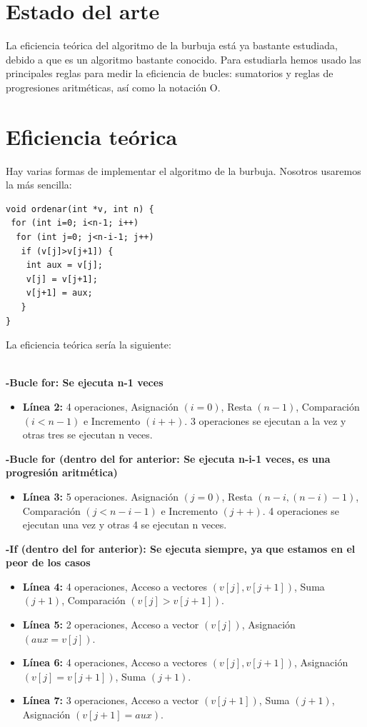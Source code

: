 \documentclass[a4paper,11pt]{article}
\begin{document}
\section{Estado del arte}
La eficiencia teórica del algoritmo de la burbuja está ya bastante estudiada, debido a que es un algoritmo bastante conocido. Para estudiarla hemos usado las principales reglas para medir la eficiencia de bucles: sumatorios y reglas de progresiones aritméticas, así como la notación O.
\section{Eficiencia teórica}
Hay varias formas de implementar el algoritmo de la burbuja. Nosotros usaremos la más sencilla:
\lstset{language=C, breaklines=true, basicstyle=\footnotesize}
\begin{lstlisting}[frame=single]
void ordenar(int *v, int n) {
 for (int i=0; i<n-1; i++)
  for (int j=0; j<n-i-1; j++)
   if (v[j]>v[j+1]) {
    int aux = v[j];
    v[j] = v[j+1];
    v[j+1] = aux;
   }
}
\end{lstlisting}
La eficiencia teórica sería la siguiente:\\ \\
\begin{large}
{\bf -Bucle for: Se ejecuta n-1 veces}
\end{large}
\begin{itemize}
\item {\bf Línea 2:} 4 operaciones, Asignación $(i=0)$, Resta $(n-1)$, Comparación $(i<n-1)$ e Incremento $(i++)$. 3 operaciones se ejecutan a la vez y otras tres se ejecutan n veces.
\end{itemize}
\begin{large}
{\bf -Bucle for (dentro del for anterior: Se ejecuta n-i-1 veces, es una progresión aritmética)}
\end{large}
\begin{itemize}
\item {\bf Línea 3:} 5 operaciones. Asignación $(j=0)$, Resta $(n-i,(n-i)-1)$, Comparación $(j<n-i-1)$ e Incremento $(j++)$. 4 operaciones se ejecutan una vez y otras 4 se ejecutan n veces.
\end{itemize}
\begin{large}
{\bf -If (dentro del for anterior): Se ejecuta siempre, ya que estamos en el peor de los casos}
\end{large}
\begin{itemize}
\item {\bf Línea 4:} 4 operaciones, Acceso a vectores $(v[j],v[j+1])$, Suma $(j+1)$, Comparación $(v[j]>v[j+1])$.
\item {\bf Línea 5:} 2 operaciones, Acceso a vector $(v[j])$, Asignación $(aux=v[j])$.
\item {\bf Línea 6:} 4 operaciones, Acceso a vectores $(v[j],v[j+1])$, Asignación $(v[j]=v[j+1])$, Suma $(j+1)$.
\item {\bf Línea 7:} 3 operaciones, Acceso a vector $(v[j+1])$, Suma $(j+1)$, Asignación $(v[j+1]=aux)$. 
\end{itemize}
\end{document}
